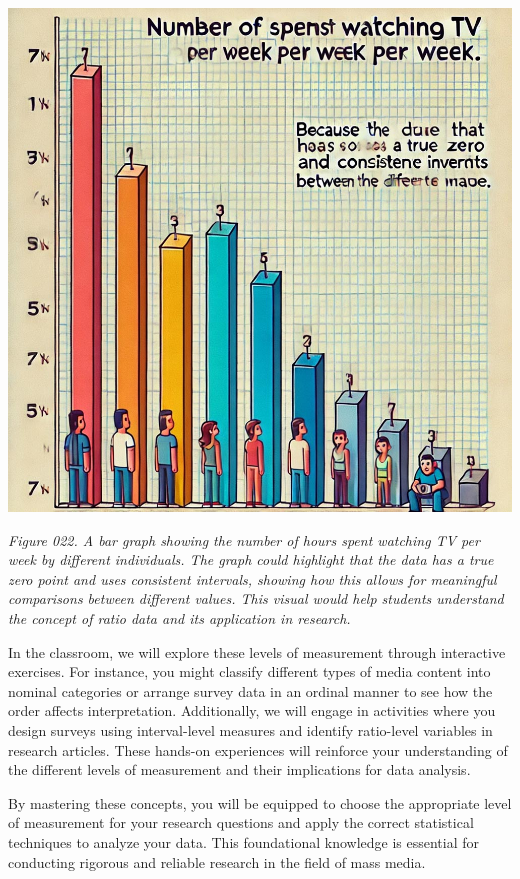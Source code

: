 \documentclass[
]{book}
\begin{document}
\includegraphics[width=1\textwidth,height=\textheight]{images/fig022.jpg}

\emph{Figure 022. A bar graph showing the number of hours spent watching TV per week by different individuals. The graph could highlight that the data has a true zero point and uses consistent intervals, showing how this allows for meaningful comparisons between different values. This visual would help students understand the concept of ratio data and its application in research.}

In the classroom, we will explore these levels of measurement through interactive exercises. For instance, you might classify different types of media content into nominal categories or arrange survey data in an ordinal manner to see how the order affects interpretation. Additionally, we will engage in activities where you design surveys using interval-level measures and identify ratio-level variables in research articles. These hands-on experiences will reinforce your understanding of the different levels of measurement and their implications for data analysis.

By mastering these concepts, you will be equipped to choose the appropriate level of measurement for your research questions and apply the correct statistical techniques to analyze your data. This foundational knowledge is essential for conducting rigorous and reliable research in the field of mass media.
\end{document}
